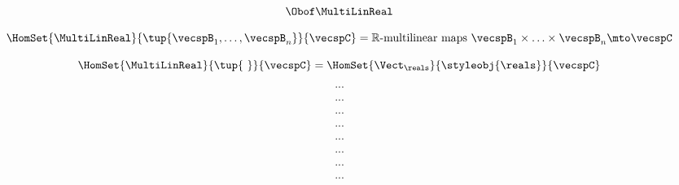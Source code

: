 \begin{forslides}
     \begin{equation}
        \label{eq:slides_multicategories_08}
      \Obof\MultiLinReal
    \end{equation}
    
    \begin{equation}
        \label{eq:slides_multicategories_09}
       \HomSet{\MultiLinReal}{\tup{\vecspB_1,\ldots,\vecspB_n}}{\vecspC} = \mathbb{R}\text{-multilinear maps } \vecspB_1 \times \ldots \times \vecspB_n \mto \vecspC
    \end{equation}
    
     \begin{equation}
        \label{eq:slides_multicategories_10}
       \HomSet{\MultiLinReal}{\tup{ \ }}{\vecspC}=\HomSet{\Vect_\reals}{ \styleobj{\reals} }{\vecspC}
    \end{equation}
    
    \begin{equation}
        \label{eq:slides_multicategories_11}
       ...
    \end{equation}
    
     \begin{equation}
        \label{eq:slides_multicategories_12}
       ...
    \end{equation}
    
     \begin{equation}
        \label{eq:slides_multicategories_13}
      ...
    \end{equation}
    
     \begin{equation}
        \label{eq:slides_multicategories_14}
      ...
    \end{equation}
    
    \begin{equation}
        \label{eq:slides_multicategories_15}
       ...
    \end{equation}
    
     \begin{equation}
        \label{eq:slides_multicategories_16}
       ...
    \end{equation}
    
     \begin{equation}
        \label{eq:slides_multicategories_17}
      ...
    \end{equation}
    
     \begin{equation}
        \label{eq:slides_multicategories_18}
      ...
    \end{equation}
    

\end{forslides}
